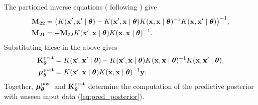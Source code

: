 The partioned inverse equations (\citealp*{barnett1979matrix} following \citealp*{mackay1998introduction}) give
\begin{align*}
  \Mbf_{22} &= \big(K(\xprime,\xprime \midtheta ) - K(\xprime,\xbf \midtheta ) K(\xbf,\xbf \midtheta )^{-1}
K(\xbf,\xprime \midtheta )\big)^{-1}, \\
  \Mbf_{21} &= -\Mbf_{22} K(\xprime,\xbf \midtheta ) K(\xbf,\xbf \midtheta )^{-1}.
\end{align*}
Substituting these in the above gives
\begin{align}
  \Kpost &= K(\xprime,\xprime \midtheta ) - K(\xprime,\xbf \midtheta )
K(\xbf,\xbf \midtheta )^{-1} K(\xbf,\xprime \midtheta ),\label{eq:K_hat} \\
  \mupost &= K(\xprime,\xbf \midtheta ) K(\xbf,\xbf \midtheta )^{-1}\ybf.\label{eq:mu_hat}
\end{align}
Together, $\mupost$ and $\Kpost$ determine the computation of the predictive posterior
with unseen input data (\ref{eq:pred_posterior}).

